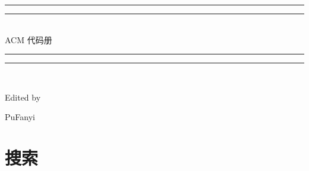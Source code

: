 \documentclass[a4paper,11pt,twoside,fontset = fandol,UTF8]{ctexbook} %
\begin{document}
 
  \begin{titlepage}       %
  \centering
  \vspace*{\baselineskip}
  \rule{\textwidth}{1.6pt}\vspace*{-\baselineskip}\vspace*{2pt}
  \rule{\textwidth}{0.4pt}\\[\baselineskip]
  {\Huge ACM 代码册}
  \\[0.2\baselineskip]
  \rule{\textwidth}{0.4pt}\vspace*{-\baselineskip}\vspace{3.2pt}
  \rule{\textwidth}{1.6pt}\\[\baselineskip]
  \scshape
  
  \vspace*{3\baselineskip}
  Edited by \\[\baselineskip] {PuFanyi\par}
  
  \par
\end{titlepage}
\newpage            %
\tableofcontents     %

\chapter{搜索}    %
\setcounter{page}{1} %
\end{document}
